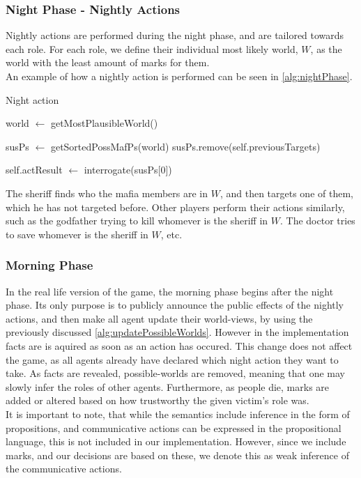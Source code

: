 \subsubsection{Night Phase - Nightly
	Actions}\label{sec:nightPhaseNightlyActions}
Nightly actions are performed during the night phase, and are tailored
towards each role. For each role, we define their individual most likely world,
$W$, as the world with the least amount of marks for them. \\ An example of how
a nightly action is performed can be seen in \cref{alg:nightPhase}.
\begin{algorithm}[H]
	\caption{Night action}
	\begin{algorithmic}[1]
		\State world $\gets$ getMostPlausibleWorld()

		\State susPs $\gets$ getSortedPossMafPs(world)
		\State susPs.remove(self.previousTargets)

		\State self.actResult $\gets$ interrogate(susPs[0])
		\EndIf
		\EndFunction

		\Statex
	\end{algorithmic}\label{alg:nightPhase}
\end{algorithm}
\setcounter{algorithmcaption}{7}
The sheriff finds who the mafia members are in $W$, and then targets one of
them, which he has not targeted before. Other players perform their actions
similarly, such as the godfather trying to kill whomever is the sheriff in $W$.
The doctor tries to save whomever is the sheriff in $W$, etc.

\subsubsection{Morning Phase}\label{sec:morningPhase}
In the real life version of the game, the morning phase begins after the night phase. 
Its only purpose is to publicly announce the public effects of the
nightly actions, and then make all agent update their world-views, by using the
previously discussed \cref{alg:updatePossibleWorlds}. However in the implementation
facts are is aquired as soon as an action has occured. This change does not affect the game, 
as all agents already have declared which night action they want to take.
As facts are revealed, possible-worlds are removed, meaning that one may slowly infer the roles of
other agents. Furthermore, as people die, marks are added or altered based on
how trustworthy the given victim's role was. \\ It is important to note, that
while the semantics include inference in the form of propositions, and
communicative actions can be expressed in the propositional language, this is
not included in our implementation. However, since we include marks, and our
decisions are based on these, we denote this as weak inference of the
communicative actions.

